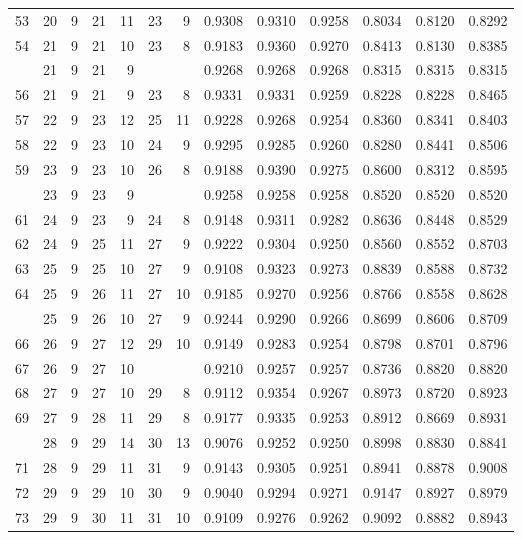\begin{Schunk}
\begin{longtable}{rrrrrrrrrrrrr}
53 & 20 & 9 & 21 & 11 & 23 & 9 & 0.9308 & 0.9310 & 0.9258 & 0.8034 & 0.8120 & 0.8292\\
54 & 21 & 9 & 21 & 10 & 23 & 8 & 0.9183 & 0.9360 & 0.9270 & 0.8413 & 0.8130 & 0.8385\\
\addlinespace
55 & 21 & 9 & 21 & 9 &  &  & 0.9268 & 0.9268 & 0.9268 & 0.8315 & 0.8315 & 0.8315\\
56 & 21 & 9 & 21 & 9 & 23 & 8 & 0.9331 & 0.9331 & 0.9259 & 0.8228 & 0.8228 & 0.8465\\
57 & 22 & 9 & 23 & 12 & 25 & 11 & 0.9228 & 0.9268 & 0.9254 & 0.8360 & 0.8341 & 0.8403\\
58 & 22 & 9 & 23 & 10 & 24 & 9 & 0.9295 & 0.9285 & 0.9260 & 0.8280 & 0.8441 & 0.8506\\
59 & 23 & 9 & 23 & 10 & 26 & 8 & 0.9188 & 0.9390 & 0.9275 & 0.8600 & 0.8312 & 0.8595\\
\addlinespace
60 & 23 & 9 & 23 & 9 &  &  & 0.9258 & 0.9258 & 0.9258 & 0.8520 & 0.8520 & 0.8520\\
61 & 24 & 9 & 23 & 9 & 24 & 8 & 0.9148 & 0.9311 & 0.9282 & 0.8636 & 0.8448 & 0.8529\\
62 & 24 & 9 & 25 & 11 & 27 & 9 & 0.9222 & 0.9304 & 0.9250 & 0.8560 & 0.8552 & 0.8703\\
63 & 25 & 9 & 25 & 10 & 27 & 9 & 0.9108 & 0.9323 & 0.9273 & 0.8839 & 0.8588 & 0.8732\\
64 & 25 & 9 & 26 & 11 & 27 & 10 & 0.9185 & 0.9270 & 0.9256 & 0.8766 & 0.8558 & 0.8628\\
\addlinespace
65 & 25 & 9 & 26 & 10 & 27 & 9 & 0.9244 & 0.9290 & 0.9266 & 0.8699 & 0.8606 & 0.8709\\
66 & 26 & 9 & 27 & 12 & 29 & 10 & 0.9149 & 0.9283 & 0.9254 & 0.8798 & 0.8701 & 0.8796\\
67 & 26 & 9 & 27 & 10 &  &  & 0.9210 & 0.9257 & 0.9257 & 0.8736 & 0.8820 & 0.8820\\
68 & 27 & 9 & 27 & 10 & 29 & 8 & 0.9112 & 0.9354 & 0.9267 & 0.8973 & 0.8720 & 0.8923\\
69 & 27 & 9 & 28 & 11 & 29 & 8 & 0.9177 & 0.9335 & 0.9253 & 0.8912 & 0.8669 & 0.8931\\
\addlinespace
70 & 28 & 9 & 29 & 14 & 30 & 13 & 0.9076 & 0.9252 & 0.9250 & 0.8998 & 0.8830 & 0.8841\\
71 & 28 & 9 & 29 & 11 & 31 & 9 & 0.9143 & 0.9305 & 0.9251 & 0.8941 & 0.8878 & 0.9008\\
72 & 29 & 9 & 29 & 10 & 30 & 9 & 0.9040 & 0.9294 & 0.9271 & 0.9147 & 0.8927 & 0.8979\\
73 & 29 & 9 & 30 & 11 & 31 & 10 & 0.9109 & 0.9276 & 0.9262 & 0.9092 & 0.8882 & 0.8943\\

\end{longtable}
\end{Schunk}
